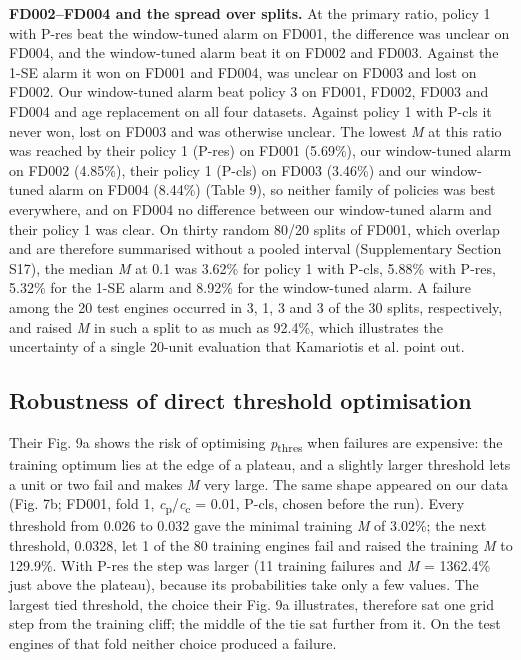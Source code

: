\documentclass[a4paper,fleqn,doubleblind]{cas-dc}
\begin{document}
\textbf{FD002--FD004 and the spread over splits.} At the primary ratio, policy 1 with P-res beat the window-tuned alarm on FD001, the difference was unclear on FD004, and the window-tuned alarm beat it on FD002 and FD003. Against the 1-SE alarm it won on FD001 and FD004, was unclear on FD003 and lost on FD002. Our window-tuned alarm beat policy 3 on FD001, FD002, FD003 and FD004 and age replacement on all four datasets. Against policy 1 with P-cls it never won, lost on FD003 and was otherwise unclear. The lowest \textit{M} at this ratio was reached by their policy 1 (P-res) on FD001 (5.69\%), our window-tuned alarm on FD002 (4.85\%), their policy 1 (P-cls) on FD003 (3.46\%) and our window-tuned alarm on FD004 (8.44\%) (Table 9), so neither family of policies was best everywhere, and on FD004 no difference between our window-tuned alarm and their policy 1 was clear. On thirty random 80/20 splits of FD001, which overlap and are therefore summarised without a pooled interval (Supplementary Section S17), the median \textit{M} at 0.1 was 3.62\% for policy 1 with P-cls, 5.88\% with P-res, 5.32\% for the 1-SE alarm and 8.92\% for the window-tuned alarm. A failure among the 20 test engines occurred in 3, 1, 3 and 3 of the 30 splits, respectively, and raised \textit{M} in such a split to as much as 92.4\%, which illustrates the uncertainty of a single 20-unit evaluation that Kamariotis et al. point out.

\subsection{Robustness of direct threshold optimisation}

Their Fig. 9a shows the risk of optimising \textit{p}\textsubscript{thres} when failures are expensive: the training optimum lies at the edge of a plateau, and a slightly larger threshold lets a unit or two fail and makes \textit{M} very large. The same shape appeared on our data (Fig. 7b; FD001, fold 1, \textit{c}\textsubscript{p}/\textit{c}\textsubscript{c} = 0.01, P-cls, chosen before the run). Every threshold from 0.026 to 0.032 gave the minimal training \textit{M} of 3.02\%; the next threshold, 0.0328, let 1 of the 80 training engines fail and raised the training \textit{M} to 129.9\%. With P-res the step was larger (11 training failures and \textit{M} = 1362.4\% just above the plateau), because its probabilities take only a few values. The largest tied threshold, the choice their Fig. 9a illustrates, therefore sat one grid step from the training cliff; the middle of the tie sat further from it. On the test engines of that fold neither choice produced a failure.
\end{document}
